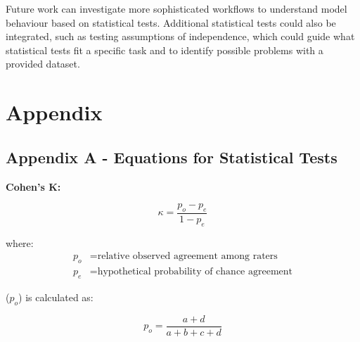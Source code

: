 \documentclass[10.7pt, onecolumn]{article}
\begin{document}
Future work can investigate more sophisticated workflows to understand model behaviour based on statistical tests. Additional statistical tests could also be integrated, such as testing assumptions of independence, which could guide what statistical tests fit a specific task and to identify possible problems with a provided dataset\cite{article2}.





\newpage
\section{Appendix}

\subsection{Appendix A - Equations for Statistical Tests}


\textbf{Cohen's K:}

\begin{equation}
  \kappa = \frac{p_o - p_e}{1 - p_e}
  \end{equation}
  
  where:
  \begin{align*}
  p_o & = \text{relative observed agreement among raters} \\
  p_e & = \text{hypothetical probability of chance agreement}
  \end{align*}
  
  ($p_o$) is calculated as:
  
  \begin{equation}
  p_o = \frac{a + d}{a + b + c + d}
  \end{equation}
  
\end{document}
